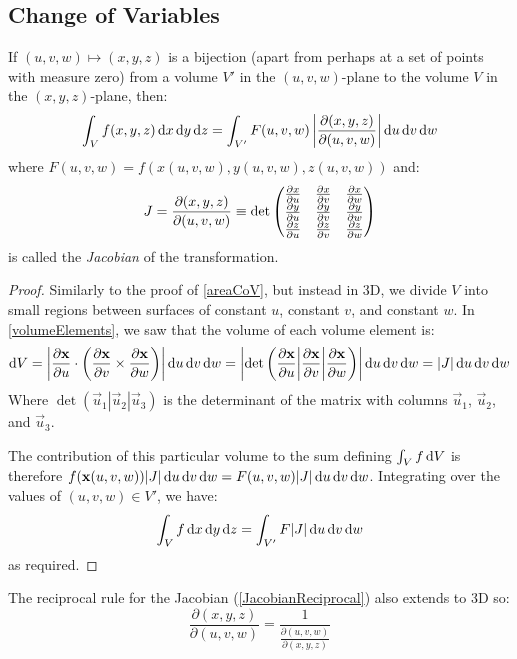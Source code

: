 \documentclass[../main.tex]{subfiles}
\begin{document}
\subsection{Change of Variables}
\begin{proposition}
  If $(u, v, w) \mapsto (x, y, z)$ is a bijection (apart from perhaps at a set of points with measure zero) from a volume $V'$ in the $(u, v, w)$-plane to the volume $V$ in the $(x, y, z)$-plane, then:
  \[
    \int_V f(x, y, z) \d{x} \d{y} \d{z} = \int_{V'} F(u, v, w) \abs{\frac{\partial(x, y, z)}{\partial(u, v, w)}} \d{u}\d{v}\d{w}
  \]
  where $F(u, v, w) = f(x(u, v, w), y(u, v, w), z(u, v, w))$ and:
  \[
    J = \frac{\partial(x, y, z)}{\partial(u, v, w)} \equiv \det \begin{pmatrix}
      \pderiv{x}{u} & \pderiv{x}{v} & \pderiv{x}{w} \\
      \pderiv{y}{u} & \pderiv{y}{v} & \pderiv{y}{w} \\
      \pderiv{z}{u} & \pderiv{z}{v} & \pderiv{z}{w} \\
    \end{pmatrix}
  \]
  is called the \textit{Jacobian} of the transformation.
\end{proposition}
\begin{proof}
  Similarly to the proof of \cref{areaCoV}, but instead in 3D, we divide $V$ into small regions between surfaces of constant $u$, constant $v$, and constant $w$.
  In \cref{volumeElements}, we saw that the volume of each volume element is:
  \[
    \d{V} = \abs{\pderiv{\vec{x}}{u} \cdot \left(\pderiv{\vec{x}}{v} \times \pderiv{\vec{x}}{w}\right)}\d{u}\d{v}\d{w} = \abs{\det\left(\pderiv{\vec{x}}{u} \middle\vert \pderiv{\vec{x}}{v} \middle\vert \pderiv{\vec{x}}{w}\right)}\d{u}\d{v}\d{w} = |J| \d{u}\d{v}\d{w}
  \]
  Where $\det(\vec{u}_1 | \vec{u}_2 | \vec{u}_3)$ is the determinant of the matrix with columns $\vec{u}_1$, $\vec{u}_2$, and $\vec{u}_3$.

  The contribution of this particular volume to the sum defining $\int_V f \d{V}$ is therefore $f(\vec{x}(u, v, w))|J| \d{u} \d{v} \d{w} = F(u, v, w) |J| \d{u} \d{v} \d{w}$.
  Integrating over the values of $(u, v, w) \in V'$, we have:
  \[
    \int_V f \d{x} \d{y} \d{z} = \int_{V'} F |J|\d{u} \d{v} \d{w}
  \]
  as required.
\end{proof}
The reciprocal rule for the Jacobian (\cref{JacobianReciprocal}) also extends to 3D so:
\[
  \frac{\partial(x, y, z)}{\partial(u, v, w)} = \frac{1}{\frac{\partial(u, v, w)}{\partial(x, y, z)}}
\]
\end{document}
